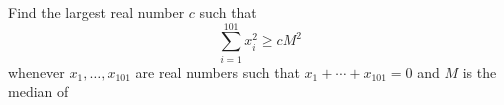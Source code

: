 Find the largest real number $c$ such that \[\sum_{i=1}^{101}x_i^2\geq cM^2\] whenever $x_1,\ldots,x_{101}$ are real numbers such that $x_1+\cdots+x_{101}=0$ and $M$ is the median of 